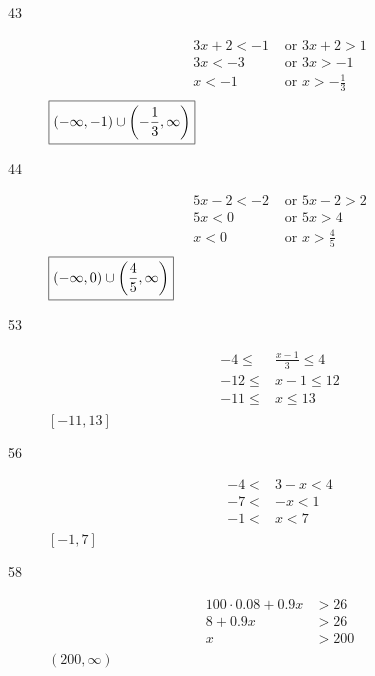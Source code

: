 \documentclass[letterpaper, landscape]{exam}
\begin{document}
\begin{description}
        \item[43]
          \begin{align*}
            3x + 2 < -1 & \text{ or } 3x + 2 > 1 \\
            3x < -3     & \text{ or } 3x > -1 \\
            x < -1      & \text{ or } x > - \frac{1}{3} \\
          \end{align*}
          $\boxed{ (-\infty, -1) \cup \del{ -\frac{1}{3}, \infty } }$

        \item[44]
          \begin{align*}
            5x - 2 < -2 & \text{ or } 5x - 2 > 2 \\
            5x < 0      & \text{ or } 5x > 4 \\
            x < 0       & \text{ or } x > \frac{4}{5} \\
          \end{align*}
          $\boxed{ (-\infty, 0) \cup \del{ \frac{4}{5}, \infty } }$

        \item[53]
          \begin{align*}
            -4 \leq  & \frac{x - 1}{3} \leq 4 \\
            -12 \leq & x - 1           \leq 12 \\
            -11 \leq & x               \leq 13 \\
          \end{align*}
          $\boxed{ [-11, 13] }$

        \item[56]
          \begin{align*}
            -4 < & 3 - x < 4 \\
            -7 < & -x    < 1 \\
            -1 < & x     < 7 \\
          \end{align*}
          $\boxed{ [-1, 7] }$

        \item[58]
          \begin{align*}
            100 \cdot 0.08 + 0.9x & > 26 \\
            8 + 0.9x              & > 26 \\
            x                     & > 200 \\
          \end{align*}
          $\boxed{ (200, \infty) }$


\end{description}
\end{document}
